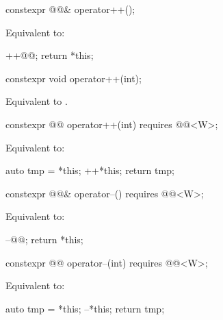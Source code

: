 \begin{itemdecl}
constexpr @@& operator++();
\end{itemdecl}

\begin{itemdescr}
\pnum
\effects
Equivalent to:
\begin{codeblock}
++@@;
return *this;
\end{codeblock}
\end{itemdescr}

\begin{itemdecl}
constexpr void operator++(int);
\end{itemdecl}

\begin{itemdescr}
\pnum
\effects
Equivalent to .
\end{itemdescr}

\begin{itemdecl}
constexpr @@ operator++(int) requires @@<W>;
\end{itemdecl}

\begin{itemdescr}
\pnum
\effects
Equivalent to:
\begin{codeblock}
auto tmp = *this;
++*this;
return tmp;
\end{codeblock}
\end{itemdescr}

\begin{itemdecl}
constexpr @@& operator--() requires @@<W>;
\end{itemdecl}

\begin{itemdescr}
\pnum
\effects
Equivalent to:
\begin{codeblock}
--@@;
return *this;
\end{codeblock}
\end{itemdescr}

\begin{itemdecl}
constexpr @@ operator--(int) requires @@<W>;
\end{itemdecl}

\begin{itemdescr}
\pnum
\effects
Equivalent to:
\begin{codeblock}
auto tmp = *this;
--*this;
return tmp;
\end{codeblock}
\end{itemdescr}

